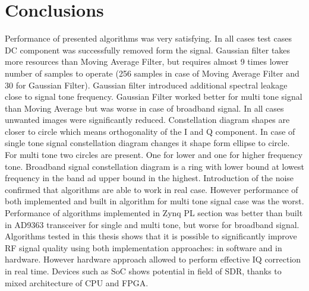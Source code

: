 \documentclass[en,printmode]{mgr}
\begin{document}
\chapter{ Conclusions}
	Performance of presented algorithms was very satisfying. In all cases test cases DC component was
	successfully removed form the signal. Gaussian filter takes more resources than Moving Average
	Filter, but requires almost 9 times lower number of samples to operate (256 samples in case of 
	Moving Average Filter and 30 for Gaussian Filter). Gaussian filter introduced additional spectral
	leakage close to signal tone frequency. Gaussian Filter worked better for multi tone signal
	than Moving Average but was worse in case of broadband signal.
	In all cases unwanted images were significantly reduced.
	Constellation diagram shapes are closer to circle which means orthogonality of the I and Q component.
	In case of single tone signal constellation diagram changes it shape form ellipse to circle. For
	multi tone two circles are present. One for lower and one for higher frequency tone. Broadband signal
	constellation diagram is a ring with lower bound at lowest frequency in the band ad upper bound in
	the highest. Introduction of the noise confirmed that algorithms are able to work in real case. 
	However performance of both implemented and built in algorithm for multi tone
	signal case was the worst. Performance of algorithms implemented in Zynq PL section was better than
	built in AD9363 transceiver for single and multi tone, but worse for broadband signal.	
	\\
	
	
	Algorithms tested in this thesis shows that it is possible to significantly improve RF signal
	quality using both implementation approaches: in software and in hardware. However hardware
	approach allowed to perform effective IQ correction in real time. Devices such as SoC shows
	potential in field of SDR, thanks to mixed architecture of CPU and FPGA.


\end{document}
